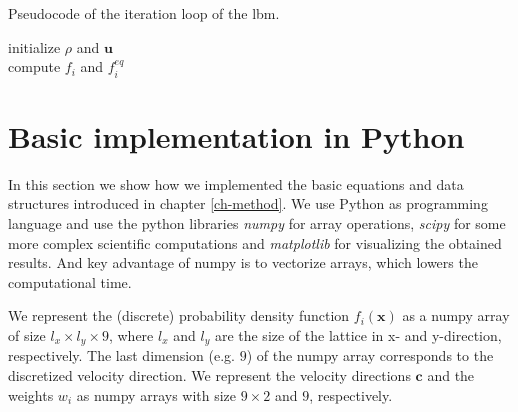 \documentclass[a4paper,11pt, footsepline]{book}
\begin{document}
\begin{algorithm}
 \caption{\label{algo-pseudeocode}Pseudocode of the iteration loop of the \ac{lbm}.}
     \SetAlgoLined
     initialize $\rho$ and $\mathbf{u}$ \\
     compute $f_i$ and $f_i^{eq}$ \\
\end{algorithm}
\section{Basic implementation in Python}
In this section we show how we implemented the basic equations and data structures introduced in chapter \ref{ch-method}. We use Python as programming language and use the python libraries \textit{numpy} \cite{Oliphant.2006,vanderWalt.2011} for array operations, \textit{scipy} \cite{Virtanen.2020} for some more complex scientific computations and \textit{matplotlib} \cite{Hunter.2007} for visualizing the obtained results. And key advantage of numpy is to vectorize arrays, which lowers the computational time.

We represent the (discrete) probability density function $f_{i}(\mathbf{x})$ as a numpy array of size $l_{x}\times l_{y}\times 9$, where $l_{x}$ and $l_{y}$ are the size of the lattice in x- and y-direction, respectively. The last dimension (e.g. $9$) of the numpy array corresponds to the discretized velocity direction.
We represent the velocity directions $\mathbf{c}$ and the weights $w_{i}$ as numpy arrays with size $9\times 2$ and $9$, respectively.
\end{document}
